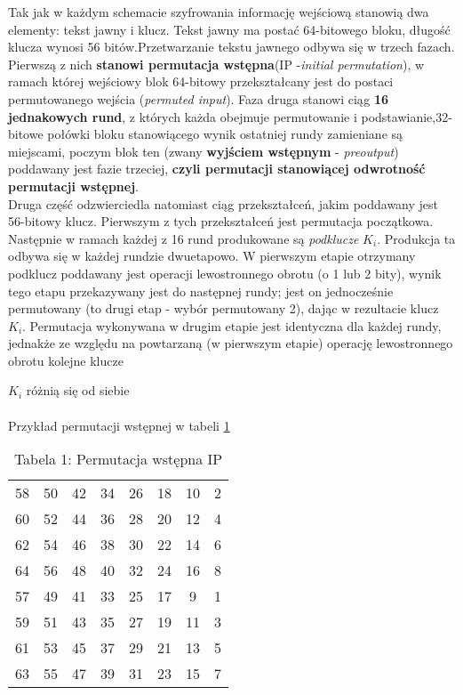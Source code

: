 \documentclass[12pt, a4paper, titlepage]{article}
\begin{document}
Tak jak w każdym schemacie szyfrowania informację wejściową stanowią dwa elementy: tekst jawny i klucz. Tekst jawny ma postać 64-bitowego bloku, długość klucza wynosi 56 bitów.Przetwarzanie tekstu jawnego odbywa się w trzech fazach. Pierwszą z nich \textbf{stanowi permutacja wstępna}(IP -\textit{initial  permutation}), w ramach której wejściowy blok 64-bitowy przekształcany jest do postaci permutowanego wejścia (\textit{permuted  input}). Faza druga stanowi ciąg \textbf{16 jednakowych rund}, z których każda obejmuje permutowanie i podstawianie,32-bitowe połówki bloku stanowiącego wynik ostatniej rundy zamieniane są miejscami, poczym blok ten (zwany \textbf{wyjściem wstępnym} - \textit{preoutput}) poddawany jest fazie trzeciej, \textbf{czyli permutacji stanowiącej odwrotność permutacji wstępnej}.
\\

\noindent Druga część odzwierciedla natomiast ciąg przekształceń, jakim poddawany jest 56-bitowy klucz. Pierwszym z tych przekształceń jest permutacja początkowa. Następnie w ramach każdej z 16 rund produkowane są \textit{podklucze} $K_i$. Produkcja ta odbywa się w każdej rundzie dwuetapowo. W pierwszym etapie otrzymany podklucz poddawany jest operacji lewostronnego obrotu (o 1 lub 2 bity), wynik tego etapu przekazywany jest do następnej rundy; jest on jednocześnie permutowany (to drugi etap - wybór permutowany 2), dając w rezultacie klucz $ K_i $. Permutacja wykonywana w drugim etapie jest identyczna dla każdej rundy, jednakże ze względu na powtarzaną (w pierwszym etapie) operację lewostronnego obrotu kolejne klucze

\newpage

\noindent $K_i$ różnią się od siebie\\ \\
\noindent Przykład permutacji wstępnej w tabeli \ref{tabela 1.2}
\begin{table}[h]
\centering\caption{Tabela 1: Permutacja wstępna IP}\label{tabela 1.2}
\begin{tabular}{|c c c c c c c c|} 
\hline
58 & 50 & 42 & 34 & 26 & 18 & 10 & 2\\
60 & 52 & 44 & 36 & 28 & 20 & 12 & 4\\
62 & 54 & 46 & 38 & 30 & 22 & 14 & 6\\
64 & 56 & 48 & 40 & 32 & 24 & 16 & 8\\
57 & 49 & 41 & 33 & 25 & 17 &  9 & 1\\
59 & 51 & 43 & 35 & 27 & 19 & 11 & 3\\
61 & 53 & 45 & 37 & 29 & 21 & 13 & 5\\
63 & 55 & 47 & 39 & 31 & 23 & 15 & 7\\
\hline
\end{tabular} 
\end{table}
\end{document}
